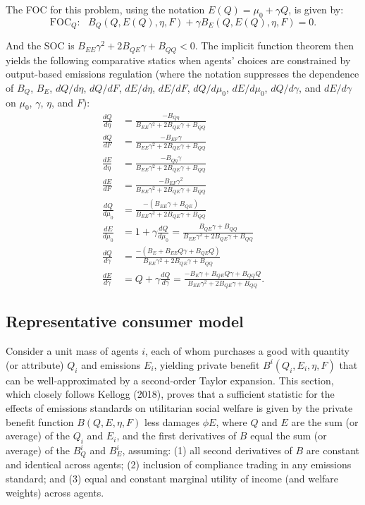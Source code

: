 \documentclass[12pt]{article}
\begin{document}
The FOC for this problem, using the notation $E(Q)=\mu_0+\gamma Q$, is given by:
\begin{equation}
\text{FOC}_Q: \text{ } B_Q(Q,E(Q),\eta,F)+\gamma B_E(Q,E(Q),\eta,F)=0. \label{eq:A1_FOCQ_c}
\end{equation}

And the SOC is $B_{EE}\gamma^2+2B_{QE}\gamma+B_{QQ}<0$. The implicit function theorem then yields the following comparative statics when agents' choices are constrained by output-based emissions regulation (where the notation suppresses the dependence of $B_Q$, $B_E$, $dQ/d\eta$, $dQ/dF$, $dE/d\eta$, $dE/dF$, $dQ/d\mu_0$, $dE/d\mu_0$, $dQ/d\gamma$, and $dE/d\gamma$ on $\mu_0$, $\gamma$, $\eta$, and $F$):
\begin{align}
\frac{dQ}{d\eta}&=\frac{-B_{Q\eta}}{B_{EE}\gamma^2+2B_{QE}\gamma+B_{QQ}} \label{eq:A1_dQdeta_c} \\
\frac{dQ}{dF}&=\frac{-B_{EF}\gamma}{B_{EE}\gamma^2+2B_{QE}\gamma+B_{QQ}} \label{eq:A1_dQdF_c} \\
\frac{dE}{d\eta}&=\frac{-B_{Q\eta}\gamma}{B_{EE}\gamma^2+2B_{QE}\gamma+B_{QQ}} \label{eq:A1_dEdeta_c} \\
\frac{dE}{dF}&=\frac{-B_{EF}\gamma^2}{B_{EE}\gamma^2+2B_{QE}\gamma+B_{QQ}} \label{eq:A1_dEdF_c} \\
\frac{dQ}{d\mu_0} &= \frac{-(B_{EE}\gamma+B_{QE})}{B_{EE}\gamma^2+2B_{QE}\gamma+B_{QQ}} \label{eq:A1_dQdu} \\
\frac{dE}{d\mu_0} &= 1+\gamma\frac{dQ}{d\mu_0}=\frac{B_{QE}\gamma+B_{QQ}}{B_{EE}\gamma^2+2B_{QE}\gamma+B_{QQ}} \label{eq:A1_dEdu} \\
\frac{dQ}{d\gamma} &= \frac{-(B_E+B_{EE}Q\gamma+B_{QE}Q)}{B_{EE}\gamma^2+2B_{QE}\gamma+B_{QQ}} \label{eq:A1_dQdgamma} \\
\frac{dE}{d\gamma} &= Q+\gamma\frac{dQ}{d\gamma}=\frac{-B_E\gamma+B_{QE}Q\gamma+B_{QQ}Q}{B_{EE}\gamma^2+2B_{QE}\gamma+B_{QQ}}. \label{eq:A1_dEdgamma}
\end{align}



\subsection{Representative consumer model \label{appx:Aggregation}}

Consider a unit mass of agents $i$, each of whom purchases a good with quantity (or attribute) $Q_i$ and emissions $E_i$, yielding private benefit $B^i(Q_i,E_i,\eta,F)$ that can be well-approximated by a second-order Taylor expansion. This section, which closely follows Kellogg (2018), proves that a sufficient statistic for the effects of emissions standards on utilitarian social welfare is given by the private benefit function $B(Q,E,\eta,F)$ less damages $\phi E$, where $Q$ and $E$ are the sum (or average) of the $Q_i$ and $E_i$, and the first derivatives of $B$ equal the sum (or average) of the $B^i_Q$ and $B^i_E$, assuming: (1) all second derivatives of $B$ are constant and identical across agents; (2) inclusion of compliance trading in any emissions standard; and (3) equal and constant marginal utility of income (and welfare weights) across agents.
\end{document}
